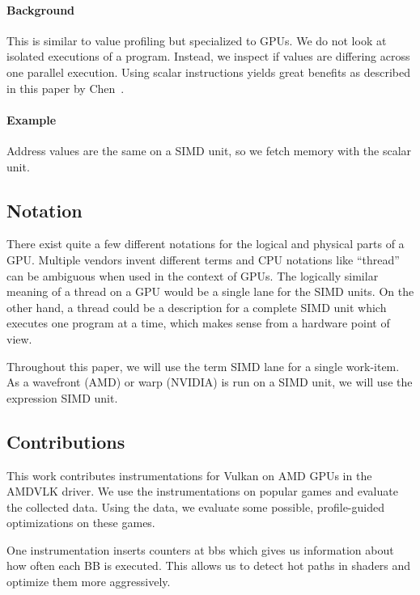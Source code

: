 \paragraph{Background} This is similar to value profiling but specialized to GPUs. We do not look at isolated executions of a program. Instead, we inspect if values are differing across one parallel execution. Using scalar instructions yields great benefits as described in this paper by Chen~\cite{Chen2016}.
\paragraph{Example} Address values are the same on a SIMD unit, so we fetch memory with the scalar unit.

\subsection{Notation}
\label{sub:notation}
There exist quite a few different notations for the logical and physical parts of a GPU. Multiple vendors invent different terms and CPU notations like \enquote{thread} can be ambiguous when used in the context of GPUs. The logically similar meaning of a thread on a GPU would be a single lane for the SIMD units. On the other hand, a thread could be a description for a complete SIMD unit which executes one program at a time, which makes sense from a hardware point of view.

Throughout this paper, we will use the term SIMD lane for a single work-item. As a wavefront (AMD) or warp (NVIDIA) is run on a SIMD unit, we will use the expression SIMD unit.


\subsection{Contributions}
\label{sub:contributions}
This work contributes instrumentations for Vulkan on AMD GPUs in the AMDVLK driver. We use the instrumentations on popular games and evaluate the collected data. Using the data, we evaluate some possible, profile-guided optimizations on these games.

One instrumentation inserts counters at \glspl{bb} which gives us information about how often each \gls{BB} is executed. This allows us to detect hot paths in shaders and optimize them more aggressively.


